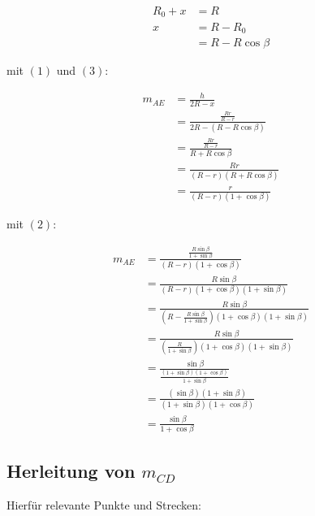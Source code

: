\documentclass[12pt,a4paper,oneside]{article}
\begin{document}
\begin{align*}
	R_0 + x &= R \\
	x &= R - R_0 \\
	&= R - R \cos\beta \tag{3}
\end{align*}

mit $(1)$ und $(3)$:

\begin{align*}
	m_{AE} &= \frac{h}{2R - x} \\
	&= \frac{\frac{Rr}{R-r}}{2R - (R-R \cos\beta)} \\
	&= \frac{\frac{Rr}{R-r}}{R+R \cos\beta} \\
	&= \frac{Rr}{(R-r)(R+R \cos\beta)} \\
	&= \frac{r}{(R-r)(1+\cos\beta)}
\end{align*}

mit $(2)$:

\begin{align*}
	m_{AE} &= \frac{\frac{R \sin\beta}{1+\sin\beta}}{(R-r)(1+\cos\beta)} \\
	&= \frac{R \sin\beta}{(R-r)(1+\cos\beta)(1+\sin\beta)} \\
	&= \frac{R \sin\beta}{(R-\frac{R \sin\beta}{1+\sin\beta})(1+\cos\beta)(1+\sin\beta)} \\
	&= \frac{R \sin\beta}{(\frac{R}{1+\sin\beta})(1+\cos\beta)(1+\sin\beta)} \\
	&= \frac{\sin\beta}{\frac{(1+\sin\beta)(1+\cos\beta)}{1+\sin\beta}} \\
	&= \frac{(\sin\beta)(1+\sin\beta)}{(1+\sin\beta)(1+\cos\beta)} \\
	&= \frac{\sin\beta}{1+\cos\beta}
\end{align*}

\pagebreak

\subsection[]{Herleitung von $m_{CD}$}
Hierfür relevante Punkte und Strecken:
\end{document}
